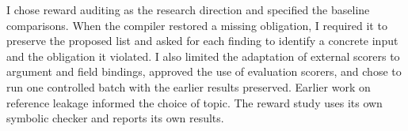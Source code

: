 \documentclass[sigconf]{acmart}
\begin{document}
I chose reward auditing as the research direction and specified the baseline comparisons. When the compiler restored a missing obligation, I required it to preserve the proposed list and asked for each finding to identify a concrete input and the obligation it violated. I also limited the adaptation of external scorers to argument and field bindings, approved the use of evaluation scorers, and chose to run one controlled batch with the earlier results preserved. Earlier work on reference leakage informed the choice of topic. The reward study uses its own symbolic checker and reports its own results.

\label{end:main}
\clearpage
\balance


\end{document}
